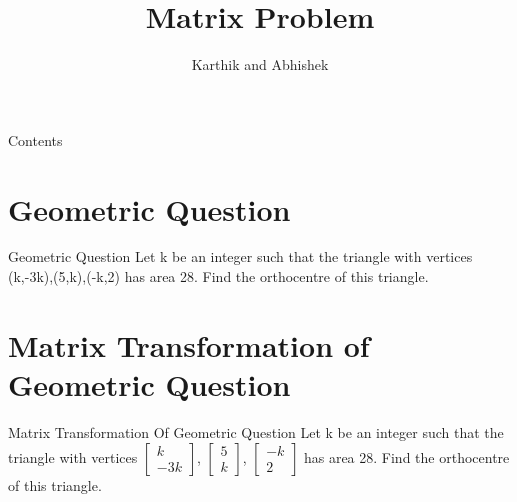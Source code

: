\documentclass{beamer}
\title{Matrix Problem}
\author{Karthik and Abhishek}
\institute{IIT Hyderabad}
\begin{document}
\begin{frame}
\titlepage    
\end{frame}
\begin{frame}{Contents}
\tableofcontents
\end{frame}
\section{Geometric Question}
\begin{frame}{Geometric Question}
Let k be an integer such that the triangle with vertices
(k,-3k),(5,k),(-k,2)
has area 28. Find the orthocentre of this triangle.    
\end{frame}
\section{Matrix Transformation of Geometric Question}
\begin{frame}{Matrix Transformation Of Geometric Question}
Let k be an integer such that the triangle with vertices
$\begin{bmatrix} k \\ -3k \end{bmatrix}$,
$\begin{bmatrix} 5 \\ k \end{bmatrix}$,
$\begin{bmatrix} -k \\ 2 \end{bmatrix}$
has area 28. Find the orthocentre of this triangle.
\end{frame}
\end{document}
